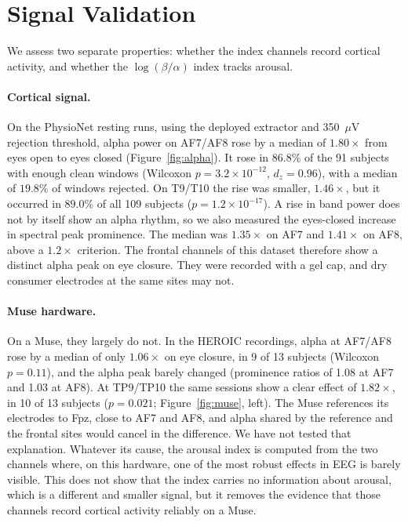 \documentclass[11pt,a4paper]{article}
\begin{document}
\section{Signal Validation}
\label{sec:validation}

We assess two separate properties: whether the index channels record cortical activity,
and whether the $\log(\beta/\alpha)$ index tracks arousal.

\paragraph{Cortical signal.} On the PhysioNet resting runs, using the deployed extractor
and 350~$\mu$V rejection threshold, alpha power on AF7/AF8 rose by a median of $1.80\times$
from eyes open to eyes closed (Figure~\ref{fig:alpha}). It rose in $86.8\%$ of the 91
subjects with enough clean windows (Wilcoxon $p = 3.2 \times 10^{-12}$, $d_z = 0.96$),
with a median of $19.8\%$ of windows rejected. On T9/T10 the rise was
smaller, $1.46\times$, but it occurred in $89.0\%$ of all 109 subjects
($p = 1.2 \times 10^{-17}$). A rise in band power does not by itself show an alpha
rhythm, so we also measured the eyes-closed increase in spectral peak prominence. The
median was $1.35\times$ on AF7 and $1.41\times$ on AF8, above a $1.2\times$ criterion. The
frontal channels of this dataset therefore show a distinct alpha peak on eye closure. They
were recorded with a gel cap, and dry consumer electrodes at the same sites may not.

\paragraph{Muse hardware.} On a Muse, they largely do not. In the HEROIC recordings, alpha
at AF7/AF8 rose by a median of only $1.06\times$ on eye closure, in 9 of 13 subjects
(Wilcoxon $p = 0.11$), and the alpha peak barely changed (prominence ratios of 1.08 at AF7
and 1.03 at AF8). At TP9/TP10 the same sessions show a clear effect of $1.82\times$, in 10 of
13 subjects ($p = 0.021$; Figure~\ref{fig:muse}, left). The Muse references its electrodes
to Fpz, close to AF7 and AF8, and alpha shared by the reference and the frontal sites would
cancel in the difference. We have not tested that explanation. Whatever its cause, the
arousal index is computed from the two channels where, on this hardware, one of the most robust
effects in EEG is barely visible. This does not show that the index carries no information
about arousal, which is a different and smaller signal, but it removes the evidence that
those channels record cortical activity reliably on a Muse.
\end{document}
